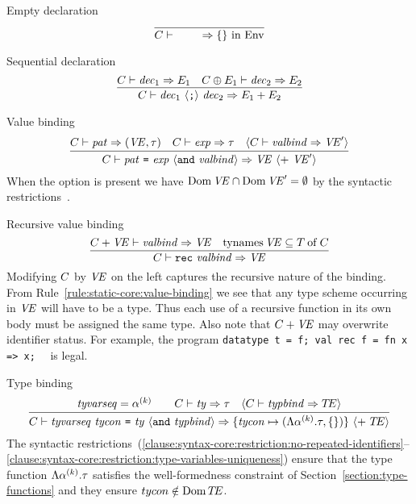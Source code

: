 \begin{sml-rule}{Empty declaration}
\begin{equation}\label{rule:static-core:empty-declaration}
\vcenter{\infer{\C\ts\emptydec\ra\emptymap\ \In\ \Env}{}}
\end{equation}
\end{sml-rule}

\begin{sml-rule}{Sequential declaration}
\begin{equation}\label{rule:static-core:sequential-declaration}
  \vcenter{\infer{\C\ts\seqdec\ra\plusmap{E_{1}}{E_{2}}}
    {\C\ts\dec_{1}\ra\E_{1}
      & \C\oplus\E_{1}\ts\dec_{2}\ra\E_{2}}}
\end{equation}
\end{sml-rule}


\begin{sml-rule}{Value binding}
\begin{equation}\label{rule:static-core:value-binding}
  \vcenter{\infer{\C\ts\longvalbind\ra\VE\ \optional{ +\ \VE'}}
    {\C\ts\pat\ra(\VE,\tau)
      & \C\ts\exp\ra\tau
      & \optional{\C\ts\valbind\ra\VE'}}}
\end{equation}
When the option is present we have $\mathop{\rm Dom}\nolimits\textit{V\kern-.05emE\/}\cap \mathop{\rm Dom}\nolimits\textit{V\kern-.05emE\/}' = \emptyset$ by
the syntactic restrictions~.
\end{sml-rule}

\begin{sml-rule}{Recursive value binding}
\begin{equation}\label{rule:static-core:recursive-value-binding}
  \vcenter{\infer{\C\ts\recvalbind\ra\VE}
    {\C+\VE\ts\valbind\ra\VE
      & \TyNamesFcn\VE\subseteq\of{\T}{\C}}}
\end{equation}
Modifying $C$ by $\textit{V\kern-.05emE\/}$ on the left captures the 
recursive nature of the binding. From Rule~\eqref{rule:static-core:value-binding} we see that any
type scheme occurring in $\textit{V\kern-.05emE\/}$ will have to be a type. Thus each use of a
recursive function in its own body must be assigned the same type.
Also note that $C+\textit{V\kern-.05emE\/}$ may overwrite 
identifier status. For example, the program
    {\tt datatype t = f; val rec f = fn x => x;}~~  is legal.
\end{sml-rule}


\begin{sml-rule}{Type binding}
\begin{equation}\label{rule:static-core:type-binding}
  \vcenter{\infer{\C\ts\longtypbind\ra\{\tycon\mapsto(\typefcnk,\emptymap)\}\ \optional{+\ \TE}}
    {\tyvarseq=\alphak\qquad\C\ts\ty\ra\tau
      & \langle\C\ts\typbind\ra\TE\rangle}}
\end{equation}
The syntactic restrictions~(\oldS\oldS\ref{clause:syntax-core:restriction:no-repeated-identifiers}--\ref{clause:syntax-core:restriction:type-variables-uniqueness}) ensure that the type function
$\Lambda\mbox{$\alpha^{(k)}$}.\tau$ satisfies the well-formedness constraint of 
Section~\ref{section:type-functions} and they ensure $tycon\notin\mathop{\rm Dom}\nolimits\mbox{$T\!E$}$.
\end{sml-rule}

